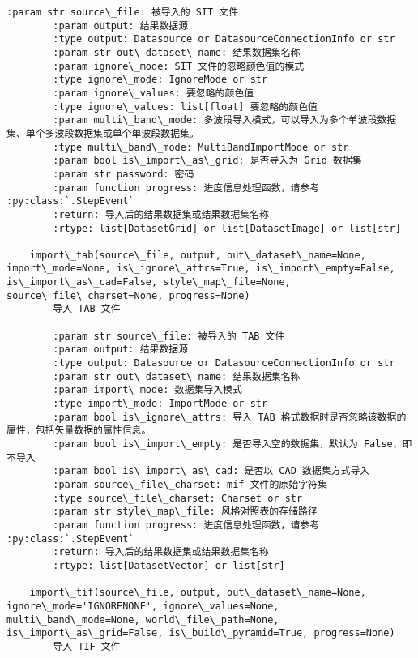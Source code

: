 \documentclass[11pt]{article}
\begin{document}
\begin{Verbatim}[commandchars=\\\{\}]
        :param str source\_file: 被导入的 SIT 文件
        :param output: 结果数据源
        :type output: Datasource or DatasourceConnectionInfo or str
        :param str out\_dataset\_name: 结果数据集名称
        :param ignore\_mode: SIT 文件的忽略颜色值的模式
        :type ignore\_mode: IgnoreMode or str
        :param ignore\_values: 要忽略的颜色值
        :type ignore\_values: list[float] 要忽略的颜色值
        :param multi\_band\_mode: 多波段导入模式，可以导入为多个单波段数据集、单个多波段数据集或单个单波段数据集。
        :type multi\_band\_mode: MultiBandImportMode or str
        :param bool is\_import\_as\_grid: 是否导入为 Grid 数据集
        :param str password: 密码
        :param function progress: 进度信息处理函数，请参考 :py:class:`.StepEvent`
        :return: 导入后的结果数据集或结果数据集名称
        :rtype: list[DatasetGrid] or list[DatasetImage] or list[str]
    
    import\_tab(source\_file, output, out\_dataset\_name=None, import\_mode=None, is\_ignore\_attrs=True, is\_import\_empty=False, is\_import\_as\_cad=False, style\_map\_file=None, source\_file\_charset=None, progress=None)
        导入 TAB 文件
        
        :param str source\_file: 被导入的 TAB 文件
        :param output: 结果数据源
        :type output: Datasource or DatasourceConnectionInfo or str
        :param str out\_dataset\_name: 结果数据集名称
        :param import\_mode: 数据集导入模式
        :type import\_mode: ImportMode or str
        :param bool is\_ignore\_attrs: 导入 TAB 格式数据时是否忽略该数据的属性，包括矢量数据的属性信息。
        :param bool is\_import\_empty: 是否导入空的数据集，默认为 False，即不导入
        :param bool is\_import\_as\_cad: 是否以 CAD 数据集方式导入
        :param source\_file\_charset: mif 文件的原始字符集
        :type source\_file\_charset: Charset or str
        :param str style\_map\_file: 风格对照表的存储路径
        :param function progress: 进度信息处理函数，请参考 :py:class:`.StepEvent`
        :return: 导入后的结果数据集或结果数据集名称
        :rtype: list[DatasetVector] or list[str]
    
    import\_tif(source\_file, output, out\_dataset\_name=None, ignore\_mode='IGNORENONE', ignore\_values=None, multi\_band\_mode=None, world\_file\_path=None, is\_import\_as\_grid=False, is\_build\_pyramid=True, progress=None)
        导入 TIF 文件
        

\end{Verbatim}
\end{document}
